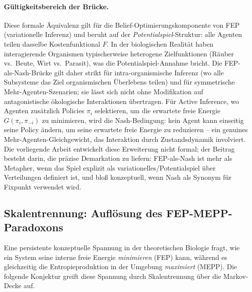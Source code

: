 \documentclass[12pt,a4paper]{article}
\theoremstyle{remark}
\begin{document}
\paragraph{Gültigkeitsbereich der Brücke.} Diese formale Äquivalenz gilt für die Belief-Optimierungskomponente von FEP (variationelle Inferenz) und beruht auf der \emph{Potentialspiel}-Struktur: alle Agenten teilen dasselbe Kostenfunktional $F$. In der biologischen Realität haben interagierende Organismen typischerweise heterogene Zielfunktionen (Räuber vs.\ Beute, Wirt vs.\ Parasit), was die Potentialspiel-Annahme bricht. Die FEP-als-Nash-Brücke gilt daher strikt für intra-organismische Inferenz (wo alle Subsysteme das Ziel organismischen Überlebens teilen) und für symmetrische Mehr-Agenten-Szenarien; sie lässt sich nicht ohne Modifikation auf antagonistische ökologische Interaktionen übertragen. Für Active Inference, wo Agenten zusätzlich Policies $\pi_i$ selektieren, um die erwartete freie Energie $G(\pi_i, \pi_{-i})$ zu minimieren, wird die Nash-Bedingung: kein Agent kann einseitig seine Policy ändern, um seine erwartete freie Energie zu reduzieren -- ein genuines Mehr-Agenten-Gleichgewicht, das Interaktion durch Zustandsdynamik involviert. Die vorliegende Arbeit entwickelt diese Erweiterung nicht formal; der Beitrag besteht darin, die präzise Demarkation zu liefern: FEP-als-Nash ist mehr als Metapher, wenn das Spiel explizit als variationelles/Potentialspiel über Verteilungen definiert ist, und bloß konzeptuell, wenn \glqq Nash\grqq{} als Synonym für \glqq Fixpunkt\grqq{} verwendet wird.

\subsection{Skalentrennung: Auflösung des FEP-MEPP-Paradoxons}
\label{sec:fep-mepp-paradox}

Eine persistente konzeptuelle Spannung in der theoretischen Biologie fragt, wie ein System seine interne freie Energie \emph{minimieren} (FEP) kann, während es gleichzeitig die Entropieproduktion in der Umgebung \emph{maximiert} (MEPP). Die folgende Konjektur greift diese Spannung durch Skalentrennung über die Markov-Decke auf.
\end{document}
